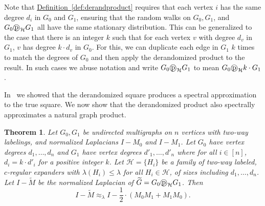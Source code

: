 \documentclass[11pt]{article}
\numberwithin{equation}{section}
\newtheorem{theorem}{Theorem}[section]
\theoremstyle{definition}
\theoremstyle{plain}
\newcommand{\expref}[2]{\hyperref[#2]{#1~\ref{#2}}}
\newcommand{\wt}{\widetilde}   %
\newcommand{\dpr}{\text{\textcircled{p}}_{\mathcal{H}}}
\numberwithin{myalgctr}{section}
\theoremstyle{named}
\begin{document}
Note that \expref{Definition}{def:derandproduct} requires that each vertex $i$ has the same degree $d_i$ in $G_0$ and $G_1$, ensuring that the random walks on $G_0,G_1$, and $G_0\dpr G_1$ all have the same stationary distribution. This can be generalized to the case that there is an integer $k$ such that for each vertex $v$ with degree $d_v$ in $G_1$, $v$ has degree $k\cdot d_v$ in $G_0$. For this, we can duplicate each edge in $G_1$ $k$ times to match the degrees of $G_0$ and then apply the derandomized product to the result. In such cases we abuse notation and write $G_0\dpr G_1$ to mean $G_0\dpr k\cdot G_1$.  

In~\cite{derandbeyond2017} we showed that the derandomized square produces a spectral approximation to the true square. We now show that the derandomized product also spectrally approximates a natural graph product. 

\begin{theorem}
\label{thm:dprapprox}
Let $G_0,G_1$ be undirected multigraphs on $n$ vertices with two-way labelings, and normalized Laplacians $I-M_0$ and $I-M_1$. Let $G_0$ have vertex degrees $d_1,\ldots,d_n$ and $G_1$ have vertex degrees $d'_1,\ldots,d'_n$ where for all $i\in[n]$, $d_i=k\cdot d'_i$ for a positive integer $k$. Let $\mathcal{H}=\{H_i\}$ be a family of two-way labeled, $c$-regular expanders with $\lambda(H_i)\leq\lambda$ for all $H_i\in\mathcal{H}$, of sizes including $d_1,\ldots,d_n$. Let $I-\wt{M}$ be the normalized Laplacian of $\wt{G}=G_0\dpr G_1$. Then
\[
I-\wt{M}\approx_{\lambda} I-\frac{1}{2}\cdot(M_0M_1+M_1M_0).
\]
\end{theorem}
\end{document}
